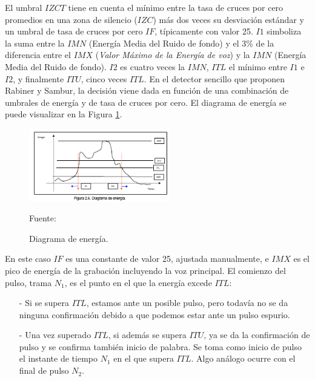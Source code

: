 \begin{enumerate}
\begin{enumerate}
El umbral $IZCT$ tiene en cuenta el mínimo entre la tasa de cruces por cero promedios en una zona de silencio ($IZC$) más dos veces su desviación estándar y un umbral de tasa de cruces por cero $IF$, típicamente con valor 25. $I1$ simboliza la suma entre la $IMN$ (Energía Media del Ruido de fondo) y el 3\% de la diferencia entre el $IMX$ (\textit{Valor Máximo de la Energía de voz}) y la $IMN$ (Energía Media del Ruido de fondo). $I2$ es cuatro veces la $IMN$, $ITL$ el mínimo entre $I1$ e $I2$, y finalmente $ITU$, cinco veces $ITL$.
\vskip 0.5cm
En el detector sencillo que proponen Rabiner y Sambur, la decisión viene dada en función de una combinación de umbrales de energía y de tasa de cruces por cero. El diagrama de energía se puede visualizar en la Figura \ref{fig:figura2.26}.
\newpage
\begin{figure}[ht]
\begin{center}
\includegraphics[width=0.55\textwidth]{Imagenes/Cap2/image027}
\end{center}
\begin{center}
\vskip -0.5cm
\caption{\small{Diagrama de energía.}}
\label{fig:figura2.26}
{\small{Fuente: \cite{varela}}}
\end{center}
\end{figure}

En este caso $IF$ es una constante de valor 25, ajustada manualmente, e $IMX$ es el pico de energía de la grabación incluyendo la voz principal. El comienzo del pulso, trama $N_{1}$, es el punto en el que la energía excede $ITL$:

\begin{enumerate}
\item[-]Si se supera $ITL$, estamos ante un posible pulso, pero todavía no se da ninguna confirmación debido a que podemos estar ante un pulso espurio.
\item[-]Una vez superado $ITL$, si además se supera $ITU$, ya se da la confirmación de pulso y se confirma también inicio de palabra. Se toma como inicio de pulso el instante de tiempo $N_{1}$ en el que supera $ITL$. Algo análogo ocurre con el final de pulso $N_{2}$.
\end{enumerate}


\end{enumerate}
\end{enumerate}
